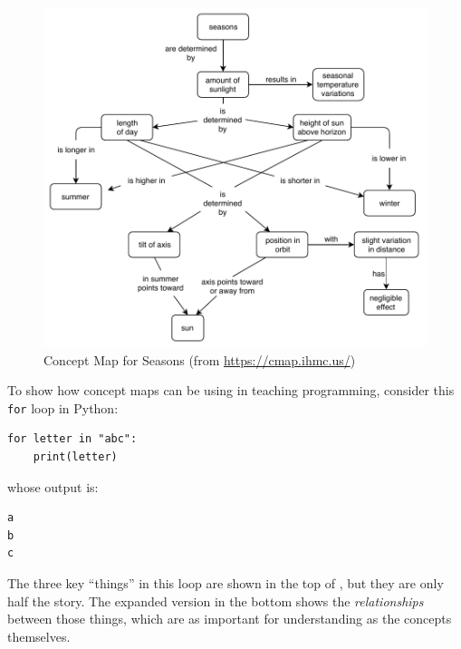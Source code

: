 \begin{figure}
\centering
\includegraphics{../docs/fig/seasons.pdf}
\caption{Concept Map for Seasons (from \url{https://cmap.ihmc.us/})}
\label{f:memory-seasons}
\end{figure}

To show how concept maps can be using in teaching programming,
consider this \texttt{for} loop in Python:

\begin{verbatim}
for letter in "abc":
    print(letter)
\end{verbatim}

\noindent
whose output is:

\begin{verbatim}
a
b
c
\end{verbatim}

\noindent
The three key ``things'' in this loop are shown in the top of
, but they are only half the story.  The
expanded version in the bottom shows the \emph{relationships} between
those things, which are as important for understanding as the concepts
themselves.

